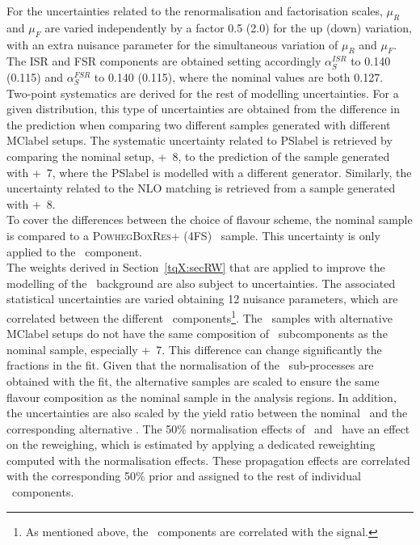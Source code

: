 For the uncertainties related to the renormalisation and factorisation scales, $\mu_R$ and $\mu_F$ are varied independently by a factor 0.5 (2.0) for the up (down) variation, with an extra nuisance parameter for the simultaneous variation of $\mu_R$ and $\mu_F$. The ISR and FSR components are obtained setting accordingly $\alpha_S^{ISR}$ to 0.140 (0.115) and $\alpha_S^{FSR}$ to 0.140 (0.115), where the nominal values are both 0.127.\\

Two-point systematics are derived for the rest of modelling uncertainties. For a given distribution, this type of uncertainties are obtained from the difference in the prediction when comparing two different samples generated with different \acrshort{MClabel} setups. The systematic uncertainty related to \acrshort{PSlabel} is retrieved by comparing the nominal setup, \POWHEGBOX+\PYTHIA~8, to the prediction of the sample generated with \POWHEGBOX+\HERWIG~7, where the \acrshort{PSlabel} is modelled with a different generator. Similarly, the uncertainty related to the NLO matching is retrieved from a sample generated with \MGMCatNLO+\PYTHIA~8.\\

To cover the differences between the choice of flavour scheme, the nominal sample is compared to a \textsc{PowhegBoxRes}+ (4FS) \ttb\ sample. This uncertainty is only applied to the \ttb\ component.\\

The weights derived in Section~\ref{tqX:secRW} that are applied to improve the modelling of the \ttbar\ background are also subject to uncertainties. The associated statistical uncertainties are varied obtaining 12 nuisance parameters, which are correlated between the different \ttbar\ components\footnote{As mentioned above, the \ttl\ components are correlated with the signal.}. The \ttbar\ samples with alternative \acrshort{MClabel} setups do not have the same composition of \ttbar\ subcomponents as the nominal sample, especially \POWHEGBOX+\HERWIG~7. This difference can change significantly the fractions in the fit. Given that the normalisation of the \ttbar\ sub-processes are obtained with the fit, the alternative samples are scaled to ensure the same flavour composition as the nominal sample in the analysis regions. In addition, the uncertainties are also scaled by the yield ratio between the nominal \ttbar\ and the corresponding alternative \ttbar. The 50\% normalisation effects of \ttb\ and \ttc\ have an effect on the reweighing, which is estimated by applying a dedicated reweighting computed with the normalisation effects. These propagation effects are correlated with the corresponding 50\% prior and assigned to the rest of individual \ttbar\ components.

